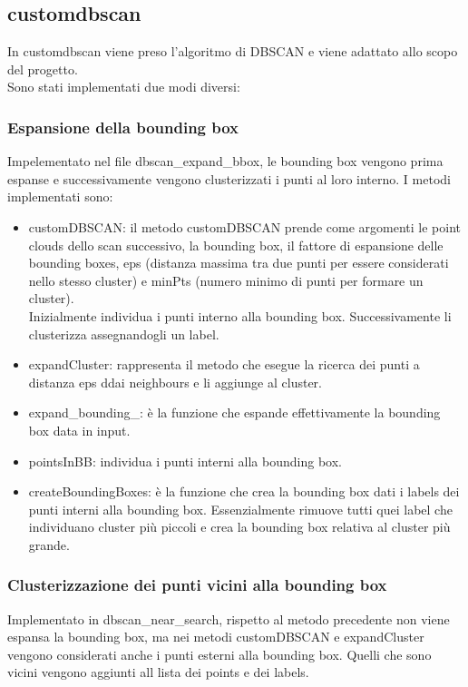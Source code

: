 \documentclass[italian]{article}
\begin{document}
\subsection{customdbscan}
In customdbscan viene preso l'algoritmo di DBSCAN e viene adattato allo scopo del progetto.\\
Sono stati implementati due modi diversi:
\subsubsection{Espansione della bounding box}
Impelementato nel file dbscan\_expand\_bbox, le bounding box vengono prima espanse e successivamente vengono clusterizzati i punti al loro interno.
I metodi implementati sono:
\begin{itemize}
	\item customDBSCAN: il metodo customDBSCAN prende come argomenti le point clouds dello scan successivo, la bounding box, il fattore di espansione delle bounding boxes, eps (distanza massima tra due punti per essere considerati nello stesso cluster) e minPts (numero minimo di punti per formare un cluster).\\ Inizialmente individua i punti interno alla bounding box. Successivamente li clusterizza assegnandogli un label.
	\item expandCluster: rappresenta il metodo che esegue la ricerca dei punti a distanza eps ddai neighbours e li aggiunge al cluster.
	\item expand\_bounding\_: è la funzione che espande effettivamente la bounding box data in input.
	\item pointsInBB: individua i punti interni alla bounding box.
	\item createBoundingBoxes: è la funzione che crea la bounding box dati i labels dei punti interni alla bounding box. Essenzialmente rimuove tutti quei label che individuano cluster più piccoli e crea la bounding box relativa al cluster più grande.
\end{itemize}
\subsubsection{Clusterizzazione dei punti vicini alla bounding box}
Implementato in dbscan\_near\_search, rispetto al metodo precedente non viene espansa la bounding box, ma nei metodi customDBSCAN e expandCluster vengono considerati anche i punti esterni alla bounding box. Quelli che sono vicini vengono aggiunti all lista dei points e dei labels.
\end{document}

